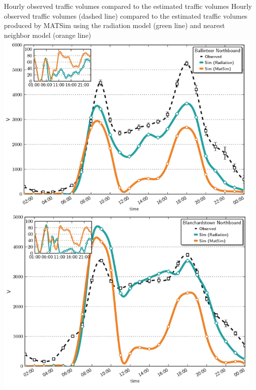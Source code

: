 \createfigure%
{Hourly observed traffic volumes compared to the estimated traffic volumes}%
{Hourly observed traffic volumes (dashed line) compared to the estimated traffic volumes produced by MATSim using the radiation model (green line) and nearest neighbor model (orange line)}%
{\label{fig:dublin1}}%
{\includegraphics[width=0.99\textwidth, angle=0]{using/figures/dublin1.png}}%
{}







